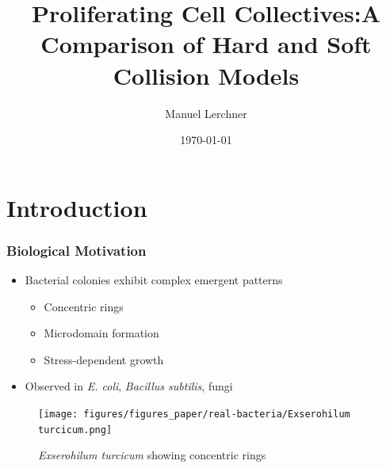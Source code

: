 \documentclass[
	10pt,
	t
]{beamer}
\title{Proliferating Cell Collectives:\newline A Comparison of Hard and Soft Collision Models}
\author{Manuel Lerchner}
\date{\today}
\begin{document}
\maketitle

\setcounter{framenumber}{0}

\section{Introduction}

\begin{frame}
    \frametitle{Biological Motivation}

    \begin{itemize}
        \item Bacterial colonies exhibit complex emergent patterns
              \begin{itemize}
                  \item Concentric rings
                  \item Microdomain formation
                  \item Stress-dependent growth
              \end{itemize}
        \item Observed in \textit{E. coli}, \textit{Bacillus subtilis}, fungi
    \end{itemize}

    \vspace{0.3cm}

    \begin{figure}
        \centering
        \texttt{[image: figures/figures\_paper/real-bacteria/Exserohilum turcicum.png]}
        \caption{\scriptsize{\textit{Exserohilum turcicum} showing concentric rings}}
    \end{figure}

\end{frame}
\end{document}
